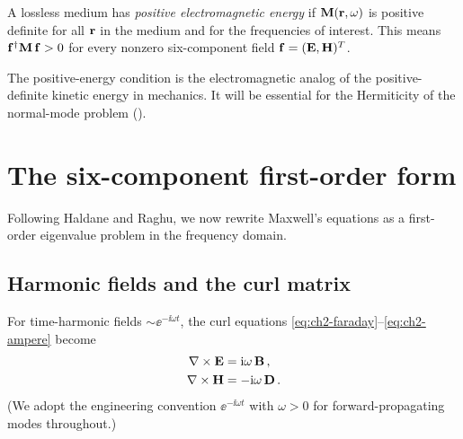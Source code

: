 \begin{definition}
  \label{def:ch2-positive-energy}
  A lossless medium has \emph{positive electromagnetic energy} if
  $\mathbf{M}(\mathbf{r},\omega)$ is positive definite for all $\mathbf{r}$ in the
  medium and for the frequencies of interest.  This means
  $\mathbf{f}^\dagger\mathbf{M}\,\mathbf{f}>0$ for every nonzero six-component
  field $\mathbf{f}=(\mathbf{E},\mathbf{H})^T$.
\end{definition}

The positive-energy condition is the electromagnetic analog of the
positive-definite kinetic energy in mechanics.  It will be essential for
the Hermiticity of the normal-mode problem
().

\section{The six-component first-order form}
\label{sec:ch2-first-order}

Following Haldane and Raghu, we now rewrite Maxwell's equations as a
first-order eigenvalue problem in the frequency domain.

\subsection{Harmonic fields and the curl matrix}
\label{sec:ch2-curl-matrix}

For time-harmonic fields $\sim\ee^{-\ii\omega t}$, the curl equations
\eqref{eq:ch2-faraday}--\eqref{eq:ch2-ampere} become
\begin{subequations}\label{eq:ch2-maxwell-freq}
\begin{align}
  \nabla\times\mathbf{E} &= \mathrm{i}\omega\,\mathbf{B}\,,
  \label{eq:ch2-faraday-freq}\\
  \nabla\times\mathbf{H} &= -\mathrm{i}\omega\,\mathbf{D}\,.
  \label{eq:ch2-ampere-freq}
\end{align}
\end{subequations}
(We adopt the engineering convention $\ee^{-\ii\omega t}$ with $\omega>0$
for forward-propagating modes throughout.)

